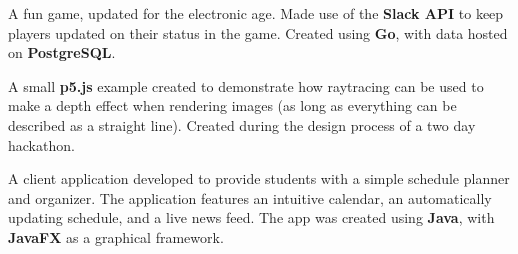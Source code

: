 \documentclass[10pt,letter,normalphoto]{altacv}
\begin{document}

\begin{fullwidth}
  \makecvheader
\end{fullwidth}

  A fun game, updated for the electronic age. Made use of the \textbf{Slack API} to keep players updated on their status in the game.
  Created using \textbf{Go}, with data hosted on \textbf{PostgreSQL}.

  \divider

  A small \textbf{p5.js} example created to demonstrate how raytracing can be used to make a depth effect when rendering images (as long as everything can be described as a straight line).
  Created during the design process of a two day hackathon.
  
  \divider



  A client application developed to provide students with a simple schedule planner and organizer.
  The application features an intuitive calendar, an automatically updating schedule, and a live news feed.
  The app was created using \textbf{Java}, with \textbf{JavaFX} as a graphical framework.
\end{document}
